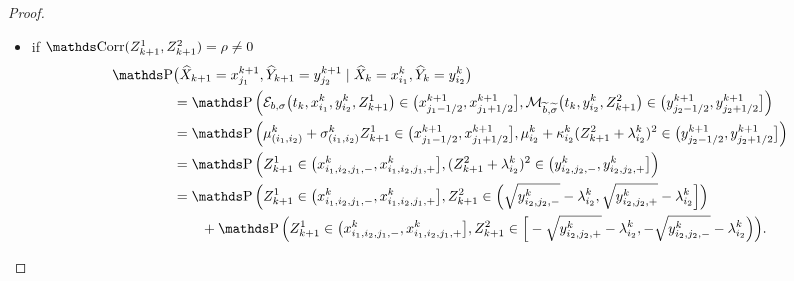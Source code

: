 \begin{proof}
\begin{itemize}[wide=0pt]
		\item if $\Corr(Z_{k+1}^1, Z_{k+1}^2) = \rho \neq 0$
		      \begin{equation*}
			      \begin{aligned}
				      \Prob & \big( \widehat X_{k+1} = x_{j_1}^{k+1}, \widehat Y_{k+1} = y_{j_2}^{k+1} \mid \widehat X_k = x_{i_1}^k, \widehat Y_k = y_{i_2}^k \big)                                                                                                                                                      \\
				            & = \Prob \Big( \mathcal{E}_{b, \sigma} \big( t_k, x_{i_1}^k, y_{i_2}^k, Z_{k+1}^1 \big) \in \big( x_{j_1-1/2}^{k+1}, x_{j_1+1/2}^{k+1} \big], \mathcal{M}_{\widetilde b, \widetilde \sigma} \big( t_k, y_{i_2}^k, Z_{k+1}^2 \big) \in \big( y_{j_2-1/2}^{k+1}, y_{j_2+1/2}^{k+1} \big] \Big) \\
				            & = \Prob \Big( \mu_{(i_1,i_2)}^k + \sigma_{(i_1,i_2)}^k Z_{k+1}^1 \in \big( x_{j_1-1/2}^{k+1}, x_{j_1+1/2}^{k+1} \big], \mu_{i_2}^k + \kappa_{i_2}^k ( Z_{k+1}^2 + \lambda_{i_2}^k )^2 \in \big( y_{j_2-1/2}^{k+1}, y_{j_2+1/2}^{k+1} \big] \Big)                                            \\
				            & = \Prob \Big( Z_{k+1}^1 \in \big( x_{i_1,i_2,j_1,-}^{k}, x_{i_1,i_2,j_1,+}^{k} \big], ( Z_{k+1}^2 + \lambda_{i_2}^k )^2 \in \big( y_{i_2,j_2,-}^{k}, y_{i_2,j_2,+}^{k} \big] \Big)                                                                                                          \\
				            & = \Prob \Big( Z_{k+1}^1 \in \big( x_{i_1,i_2,j_1,-}^{k}, x_{i_1,i_2,j_1,+}^{k} \big], Z_{k+1}^2 \in \Big( \sqrt{y_{i_2,j_2,-}^{k}} - \lambda_{i_2}^k, \sqrt{y_{i_2,j_2,+}^{k}} - \lambda_{i_2}^k \Big] \Big)                                                                                \\
				            & \qquad + \Prob \Big( Z_{k+1}^1 \in \big( x_{i_1,i_2,j_1,-}^{k}, x_{i_1,i_2,j_1,+}^{k} \big], Z_{k+1}^2 \in \Big[ - \sqrt{y_{i_2,j_2,+}^{k}} - \lambda_{i_2}^k, - \sqrt{y_{i_2,j_2,-}^{k}} - \lambda_{i_2}^k \Big) \Big).
			      \end{aligned}
		      \end{equation*}
	\end{itemize}
\end{proof}


